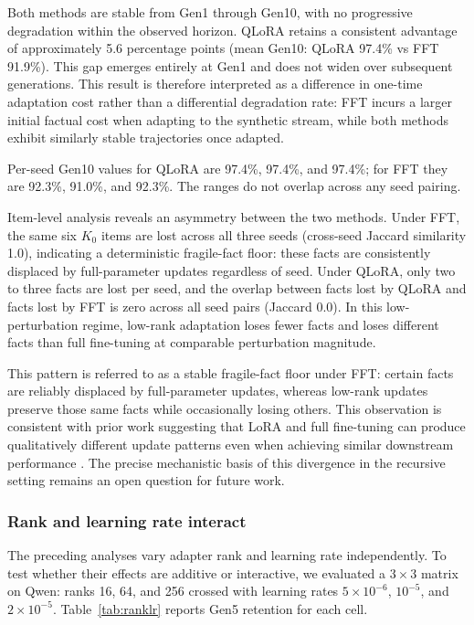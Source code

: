 \documentclass[a4paper,fleqn]{cas-dc}
\begin{document}
Both methods are stable from Gen1 through Gen10, with no progressive degradation
within the observed horizon. QLoRA retains a consistent advantage of
approximately 5.6 percentage points (mean Gen10: QLoRA 97.4\% vs FFT 91.9\%).
This gap emerges entirely at Gen1 and does not widen over subsequent generations.
This result is therefore interpreted as a difference in one-time adaptation cost rather than
a differential degradation rate: FFT incurs a larger initial factual cost when
adapting to the synthetic stream, while both methods exhibit similarly stable
trajectories once adapted.

Per-seed Gen10 values for QLoRA are 97.4\%, 97.4\%, and 97.4\%; for FFT they are
92.3\%, 91.0\%, and 92.3\%. The ranges do not overlap across any seed pairing.

Item-level analysis reveals an asymmetry between the two methods. Under FFT, the
same six $K_0$ items are lost across all three seeds (cross-seed Jaccard
similarity 1.0), indicating a deterministic fragile-fact floor: these facts are
consistently displaced by full-parameter updates regardless of seed. Under
QLoRA, only two to three facts are lost per seed, and the overlap between facts
lost by QLoRA and facts lost by FFT is zero across all seed pairs (Jaccard 0.0).
In this low-perturbation regime, low-rank adaptation loses fewer facts and loses
different facts than full fine-tuning at comparable perturbation magnitude.

This pattern is referred to as a stable fragile-fact floor under FFT: certain facts
are reliably displaced by full-parameter updates, whereas low-rank updates
preserve those same facts while occasionally losing others. This observation is
consistent with prior work suggesting that LoRA and full fine-tuning can produce
qualitatively different update patterns even when achieving similar downstream
performance \citep{shuttleworth2024illusion,biderman2024}. The precise
mechanistic basis of this divergence in the recursive setting remains an open
question for future work.

\subsubsection{Rank and learning rate interact}

The preceding analyses vary adapter rank and learning rate independently. To
test whether their effects are additive or interactive, we evaluated a
$3 \times 3$ matrix on Qwen: ranks 16, 64, and 256 crossed with learning rates
$5 \times 10^{-6}$, $10^{-5}$, and $2 \times 10^{-5}$. Table~\ref{tab:ranklr}
reports Gen5 retention for each cell.
\end{document}
